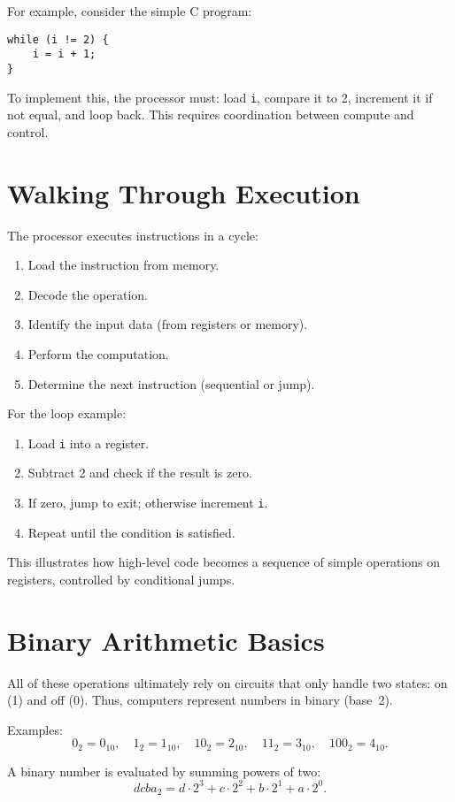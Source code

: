 \documentclass[11pt]{article}
\begin{document}
For example, consider the simple C program:
\begin{verbatim}
while (i != 2) {
    i = i + 1;
}
\end{verbatim}
To implement this, the processor must: load \texttt{i}, compare it to 2, increment it if not equal, and loop back. This requires coordination between compute and control.

\section*{Walking Through Execution}
The processor executes instructions in a cycle:
\begin{enumerate}
  \item Load the instruction from memory.
  \item Decode the operation.
  \item Identify the input data (from registers or memory).
  \item Perform the computation.
  \item Determine the next instruction (sequential or jump).
\end{enumerate}

For the loop example:
\begin{enumerate}
  \item Load \texttt{i} into a register.
  \item Subtract 2 and check if the result is zero.
  \item If zero, jump to exit; otherwise increment \texttt{i}.
  \item Repeat until the condition is satisfied.
\end{enumerate}

This illustrates how high-level code becomes a sequence of simple operations on registers, controlled by conditional jumps.

\section*{Binary Arithmetic Basics}
All of these operations ultimately rely on circuits that only handle two states: on (1) and off (0). Thus, computers represent numbers in binary (base~2).

Examples:
\[
  0_2 = 0_{10}, \quad 1_2 = 1_{10}, \quad 10_2 = 2_{10}, \quad 11_2 = 3_{10}, \quad 100_2 = 4_{10}.
\]

A binary number is evaluated by summing powers of two:
\[
  d c b a_2 = d \cdot 2^3 + c \cdot 2^2 + b \cdot 2^1 + a \cdot 2^0.
\]
\end{document}
